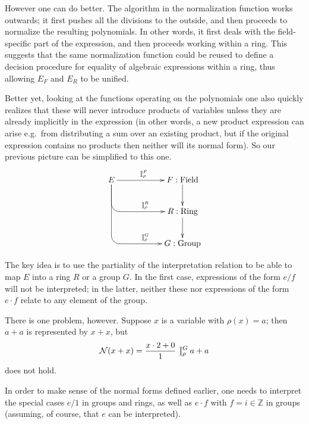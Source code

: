 \documentclass[runningheads]{llncs}
\newcommand{\intII}{\,]\![}
\newcommand{\intrelG}{\mathbin{\intII_\rho^G}}
\newcommand{\intrelF}{\mathbin{\intII_\rho^F}}
\newcommand{\intrelR}{\mathbin{\intII_\rho^R}}
\newcommand{\N}{{\cal N}}
\newcommand{\Z}{{\mathbb Z}}
\begin{document}
\noindent However one can do better.
The algorithm in the normalization function works outwards; it first
pushes all the divisions to the outside, and then proceeds to
normalize the resulting polynomials.
In other words, it first deals with the field-specific part of the expression,
and then proceeds working within a ring.
This suggests that the same normalization function could be reused to
define a decision procedure for equality of algebraic expressions within
a ring, thus allowing $E_F$ and $E_R$ to be unified.

Better yet, looking at the functions operating on the polynomials one also
quickly realizes that these will never introduce products of variables
unless they are already implicitly in the expression (in other words, a
new product expression can arise e.g.\ from distributing a sum over an
existing product, but if the original expression contains no products then
neither will its normal form).
So our previous picture can be simplified to this one.
\[
\xymatrix{
E \ar[rr]^(.45){\intrelF}
  \ar`d[dr][drr]^(.4){\intrelR}
  \ar`d[ddr][ddrr]^(.4){\intrelG}
& & F : \mbox{Field}\ar[d] \\
& & R : \mbox{Ring}\ar[d] \\
& & G : \mbox{Group} \\
}
\]

The key idea is to use the partiality of the interpretation
relation to be able to map $E$ into a ring $R$ or a group $G$.
In the first case, expressions of the form ${e/f}$ will not be
interpreted; in the latter, neither these nor expressions of the form
${e\cdot f}$ relate to any element of the group.

There is one problem, however.
Suppose $x$ is a variable with $\rho(x)=a$; then $a+a$ is represented
by $x+x$, but
$$
\N(x+x)={x\cdot2+0\over 1} \intrelG a+a
$$
\noindent does not hold.

In order to make sense of the normal forms defined earlier,
one needs to interpret the special cases $e/1$ in groups and rings,
as well as $e\cdot f$ with $f=i\in\Z$ in groups (assuming, of course,
that $e$ can be interpreted).
\end{document}
